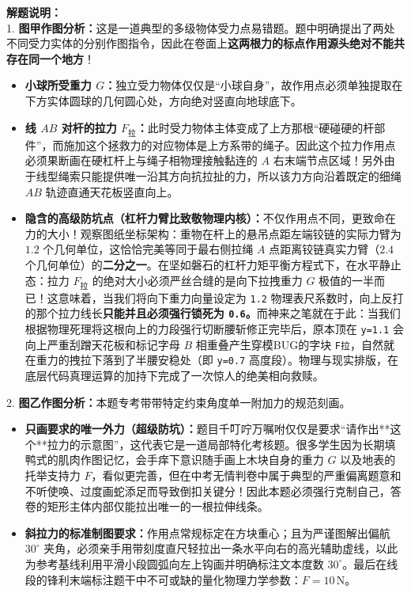 \documentclass[12pt, a4paper]{ctexrep}
\begin{document}
{\small\color{gray}
\textbf{解题说明：}\\
1. \textbf{图甲作图分析：}这是一道典型的多级物体受力点易错题。题中明确提出了两处不同受力实体的分别作图指令，因此在卷面上\textbf{这两根力的标点作用源头绝对不能共存在同一个地方}！
\begin{itemize}
    \item \textbf{小球所受重力 $G$：}独立受力物体仅仅是“小球自身”，故作用点必须单独提取在下方实体圆球的几何圆心处，方向绝对竖直向地球底下。
    \item \textbf{线 $AB$ 对杆的拉力 $F_{\text{拉}}$：}此时受力物体主体变成了上方那根“硬碰硬的杆部件”，而施加这个拯救力的对应物体是上方系带的绳子。因此这个拉力作用点必须果断画在硬杠杆上与绳子相物理接触黏连的 $A$ 右末端节点区域！另外由于线型绳索只能提供唯一沿其方向抗拉扯的力，所以该力方向沿着既定的细绳 $AB$ 轨迹直通天花板竖直向上。
    \item \textbf{隐含的高级防坑点（杠杆力臂比致敬物理内核）：}不仅作用点不同，更致命在力的大小！观察图纸坐标架构：重物在杆上的悬吊点距左端铰链的实际力臂为 $1.2$ 个几何单位，这恰恰完美等同于最右侧拉绳 $A$ 点距离铰链真实力臂（$2.4$ 个几何单位）的\textbf{二分之一}。在坚如磐石的杠杆力矩平衡方程式下，在水平静止态：拉力 $F_{\text{拉}}$ 的绝对大小必须严丝合缝的是向下拉拽重力 $G$ 极值的一半而已！这意味着，当我们将向下重力向量设定为 \texttt{1.2} 物理表尺系数时，向上反打的那个拉力线长\textbf{只能并且必须强行锁死为 \texttt{0.6}。}而神来之笔就在于此：当我们根据物理死理将这根向上的力段强行切断腰斩修正完毕后，原本顶在 \texttt{y=1.1} 会向上严重刮蹭天花板和标记字母 $B$ 相重叠产生穿模BUG的字块 \texttt{F拉}，自然就在重力的拽拉下落到了半腰安稳处（即 \texttt{y=0.7} 高度段）。物理与现实排版，在底层代码真理运算的加持下完成了一次惊人的绝美相向救赎。
\end{itemize}
2. \textbf{图乙作图分析：}本题专考带带特定约束角度单一附加力的规范刻画。
\begin{itemize}
    \item \textbf{只画要求的唯一外力（超级防坑）：}题目千叮咛万嘱咐仅仅是要求“请作出**这个**拉力的示意图”，这代表它是一道局部特化考核题。很多学生因为长期填鸭式的肌肉作图记忆，会手痒下意识随手画上木块自身的重力 $G$ 以及地表的托举支持力 $F$，看似更完善，但在中考无情判卷中属于典型的严重偏离题意和不听使唤、过度画蛇添足而导致倒扣关键分！因此本题必须强行克制自己，答卷的矩形主体内部仅能拉出唯一的一根拉伸线条。
    \item \textbf{斜拉力的标准制图要求：}作用点常规标定在方块重心；且为严谨图解出偏航 $30^{\circ}$ 夹角，必须亲手用带刻度直尺轻拉出一条水平向右的高光辅助虚线，以此为参考基线利用平滑小段圆弧向左上钩画并明确标注文本度数 $30^{\circ}$。最后在线段的锋利末端标注题干中不可或缺的量化物理力学参数：$F = 10\,\text{N}$。
\end{itemize}
}
\end{document}
